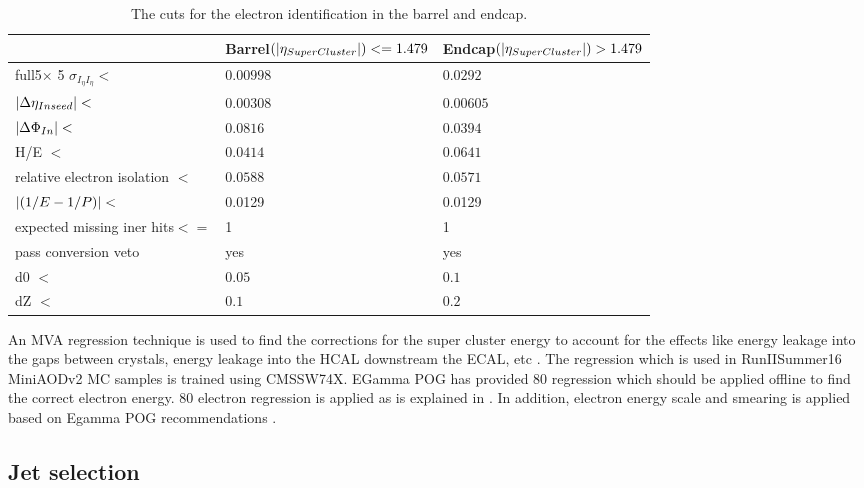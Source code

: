 \begin{table}[!h]
\begin{center}
\begin{tabular}{lll}
\hline\hline
                & Barrel$(|{\eta_{SuperCluster} }|)<=1.479 $& Endcap$(|{\eta_{SuperCluster} }|)>1.479 $  \\
\hline
full5$\times$ 5 $\sigma_{I_{\eta} I_{\eta}} < $ & $0.00998$ & $0.0292$ \\
$|{\Delta\eta_{Inseed}}|<$ & $0.00308$ & $0.00605$ \\
$|{\Delta \Phi_{In}}|<$ &$0.0816$ &$0.0394$ \\
H/E $<$& $0.0414$ & $0.0641$ \\
relative electron isolation $<$& $0.0588$&$0.0571$\\
$|{(1/E-1/P)}|<$ &0.0129&0.0129\\
expected missing iner hits$<=$&1 &1\\
pass conversion veto & yes& yes \\
d0 $<~$ &  $0.05$ & $0.1$ \\
dZ $<$& $0.1$ & $0.2$ \\
\hline
\end{tabular}
\caption{  The cuts for the electron identification in the barrel and endcap.}
\label{Tab.electrontightidentification}
\end{center}
\end{table}


An MVA regression technique is used to find the  corrections for the super cluster energy to account for the effects like energy leakage into the gaps between crystals, energy leakage into the HCAL downstream the ECAL, etc \cite{Khachatryan:2015hwa}.
The regression which is used in RunIISummer16 MiniAODv2 MC samples is trained using CMSSW74X.
EGamma POG has provided 80 regression which should be applied offline to find the correct electron energy. 80 electron regression is applied as is explained in \cite{elereg}.
In addition, electron energy scale and smearing is applied  based on Egamma POG recommendations \cite{elescale}.


\subsection{Jet selection}

